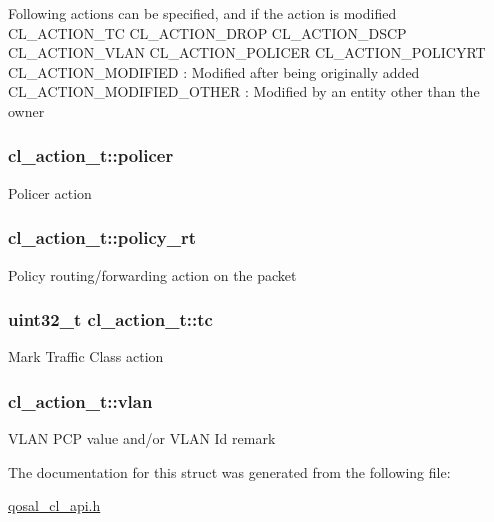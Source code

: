 Following actions can be specified, and if the action is modified C\-L\-\_\-\-A\-C\-T\-I\-O\-N\-\_\-\-T\-C C\-L\-\_\-\-A\-C\-T\-I\-O\-N\-\_\-\-D\-R\-O\-P C\-L\-\_\-\-A\-C\-T\-I\-O\-N\-\_\-\-D\-S\-C\-P C\-L\-\_\-\-A\-C\-T\-I\-O\-N\-\_\-\-V\-L\-A\-N C\-L\-\_\-\-A\-C\-T\-I\-O\-N\-\_\-\-P\-O\-L\-I\-C\-E\-R C\-L\-\_\-\-A\-C\-T\-I\-O\-N\-\_\-\-P\-O\-L\-I\-C\-Y\-R\-T C\-L\-\_\-\-A\-C\-T\-I\-O\-N\-\_\-\-M\-O\-D\-I\-F\-I\-E\-D \-: Modified after being originally added C\-L\-\_\-\-A\-C\-T\-I\-O\-N\-\_\-\-M\-O\-D\-I\-F\-I\-E\-D\-\_\-\-O\-T\-H\-E\-R \-: Modified by an entity other than the owner \hypertarget{structcl__action__t_a9a133ee1bbff2b44eb4cf39b5fd47950}{
\subsubsection[{policer}]{ cl\-\_\-action\-\_\-t\-::policer}}\label{structcl__action__t_a9a133ee1bbff2b44eb4cf39b5fd47950}
Policer action \hypertarget{structcl__action__t_a99f7a05dd6c2ea8da703b93d501c8808}{
\subsubsection[{policy\-\_\-rt}]{ cl\-\_\-action\-\_\-t\-::policy\-\_\-rt}}\label{structcl__action__t_a99f7a05dd6c2ea8da703b93d501c8808}
Policy routing/forwarding action on the packet \hypertarget{structcl__action__t_ad988ca7593a7db02a0336ca43823e713}{
\subsubsection[{tc}]{\setlength{\rightskip}{0pt plus 5cm}uint32\-\_\-t cl\-\_\-action\-\_\-t\-::tc}}\label{structcl__action__t_ad988ca7593a7db02a0336ca43823e713}
Mark Traffic Class action \hypertarget{structcl__action__t_a68aff443f2f8b721c811659a53ab81a2}{
\subsubsection[{vlan}]{ cl\-\_\-action\-\_\-t\-::vlan}}\label{structcl__action__t_a68aff443f2f8b721c811659a53ab81a2}
V\-L\-A\-N P\-C\-P value and/or V\-L\-A\-N Id remark 

The documentation for this struct was generated from the following file\-:\begin{DoxyCompactItemize}
\item 
\hyperlink{qosal__cl__api_8h}{qosal\-\_\-cl\-\_\-api.\-h}\end{DoxyCompactItemize}
